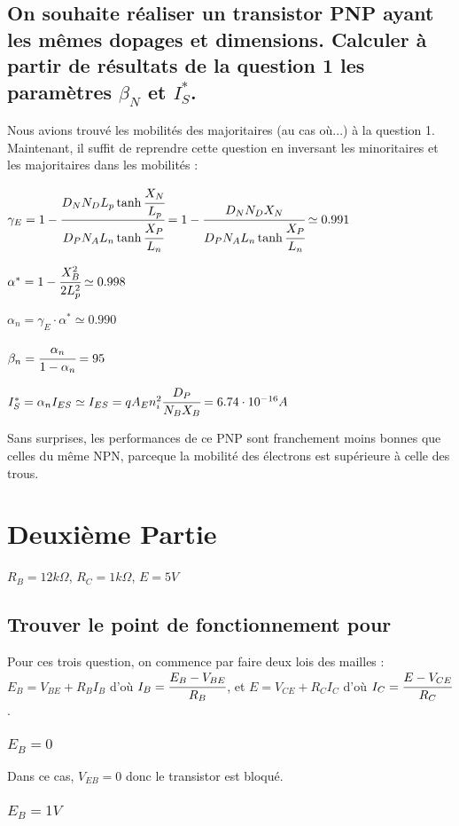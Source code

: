 \documentclass[10pt]{article}
\begin{document}
  \subsection{On souhaite réaliser un transistor PNP ayant les mêmes dopages et dimensions. Calculer à partir de résultats de la question 1 les paramètres $\beta_N$ et $I_S^\ast$.}

  Nous avions trouvé les mobilités des majoritaires (au cas où...) à la question 1. Maintenant, il suffit de reprendre cette question en inversant les minoritaires et les majoritaires dans les mobilités :

   $\gamma_E = 1 - \cfrac{D_N N_D L_p \tanh\cfrac{X_N}{L_p}}{D_P N_A L_n \tanh\cfrac{X_P}{L_n}} = 1 - \cfrac{D_N N_D X_N}{D_P N_A L_n \tanh\cfrac{X_P}{L_n}} \simeq 0.991$

   $\alpha^\ast = 1 - \cfrac{X_B^2}{2 L_p^2} \simeq 0.998$

   $\alpha_n = \gamma_E \cdot \alpha^\ast \simeq 0.990$

   $\beta_n = \cfrac{\alpha_n}{1-\alpha_n} = 95$

   $I_S^\ast = \alpha_n I_{ES} \simeq I_{ES} = q A_E n_i^2 \cfrac{D_P}{N_B X_B} = 6.74\cdot 10^{-16} A$

   Sans surprises, les performances de ce PNP sont franchement moins bonnes que celles du même NPN, parceque la mobilité des électrons est supérieure à celle des trous.

 \section{Deuxième Partie}

  $R_B=12k\Omega$, $R_C = 1k\Omega$, $E=5V$

  \subsection{Trouver le point de fonctionnement pour}
   Pour ces trois question, on commence par faire deux lois des mailles : $E_B = V_{BE} + R_B I_B$ d'où $I_B = \cfrac{E_B -V_{BE}}{R_B}$, et $E=V_{CE} + R_C I_C$ d'où $I_C = \cfrac{E-V_{CE}}{R_C}$.
   \subsubsection{$E_B=0$}

    Dans ce cas, $V_{EB} = 0$ donc le transistor est bloqué.

   \subsubsection{$E_B=1V$}
\end{document}
